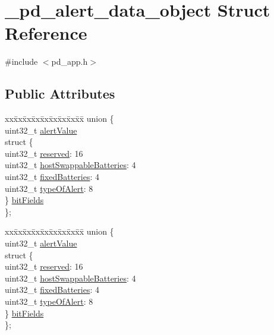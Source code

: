 \hypertarget{struct__pd__alert__data__object}{\section{\-\_\-pd\-\_\-alert\-\_\-data\-\_\-object Struct Reference}
\label{struct__pd__alert__data__object}
}


{\ttfamily \#include $<$pd\-\_\-app.\-h$>$}

\subsection*{Public Attributes}
\begin{DoxyCompactItemize}
\item 
\begin{tabbing}
xx\=xx\=xx\=xx\=xx\=xx\=xx\=xx\=xx\=\kill
union \{\\
\>uint32\_t \hyperlink{struct__pd__alert__data__object_aed9a5657c490967d07dd7961217bc0f2}{alertValue}\\
\>struct \{\\
\>\>uint32\_t \hyperlink{struct__pd__alert__data__object_a23d29e1d570b84c87f3ff7832fc282f4}{reserved}: 16\\
\>\>uint32\_t \hyperlink{struct__pd__alert__data__object_ab4e7f83416c6dda7638828545fa92109}{hostSwappableBatteries}: 4\\
\>\>uint32\_t \hyperlink{struct__pd__alert__data__object_aece8b77da3ae31996a4aad59924f47f7}{fixedBatteries}: 4\\
\>\>uint32\_t \hyperlink{struct__pd__alert__data__object_ad73d27b0e318aafc2aeb84ab5eb487b2}{typeOfAlert}: 8\\
\>\} \hyperlink{struct__pd__alert__data__object_a2cd260346b89e8818ac9a0fe06a69297}{bitFields}\\
\}; \\

\end{tabbing}\item 
\begin{tabbing}
xx\=xx\=xx\=xx\=xx\=xx\=xx\=xx\=xx\=\kill
union \{\\
\>uint32\_t \hyperlink{struct__pd__alert__data__object_aed9a5657c490967d07dd7961217bc0f2}{alertValue}\\
\>struct \{\\
\>\>uint32\_t \hyperlink{struct__pd__alert__data__object_a23d29e1d570b84c87f3ff7832fc282f4}{reserved}: 16\\
\>\>uint32\_t \hyperlink{struct__pd__alert__data__object_ab4e7f83416c6dda7638828545fa92109}{hostSwappableBatteries}: 4\\
\>\>uint32\_t \hyperlink{struct__pd__alert__data__object_aece8b77da3ae31996a4aad59924f47f7}{fixedBatteries}: 4\\
\>\>uint32\_t \hyperlink{struct__pd__alert__data__object_ad73d27b0e318aafc2aeb84ab5eb487b2}{typeOfAlert}: 8\\
\>\} \hyperlink{struct__pd__alert__data__object_a34c4d1f20393010bd2924cca9cab1bde}{bitFields}\\
\}; \\


\end{tabbing}
\end{DoxyCompactItemize}
